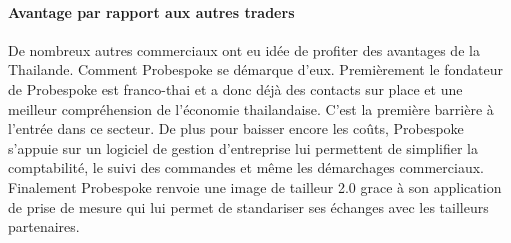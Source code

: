 \paragraph{Avantage par rapport aux autres traders}
De nombreux autres commerciaux ont eu idée de profiter des avantages de la Thailande. Comment Probespoke se démarque d'eux. Premièrement le fondateur de Probespoke est franco-thai et a donc déjà des contacts sur place et une meilleur compréhension de l'économie thailandaise. C'est la première barrière à l'entrée dans ce secteur. De plus pour baisser encore les coûts, Probespoke s'appuie sur un logiciel de gestion d'entreprise lui permettent de simplifier la comptabilité, le suivi des commandes et même les démarchages commerciaux. Finalement Probespoke renvoie une image de tailleur 2.0 grace à son application de prise de mesure qui lui permet de standariser ses échanges avec les tailleurs partenaires.


